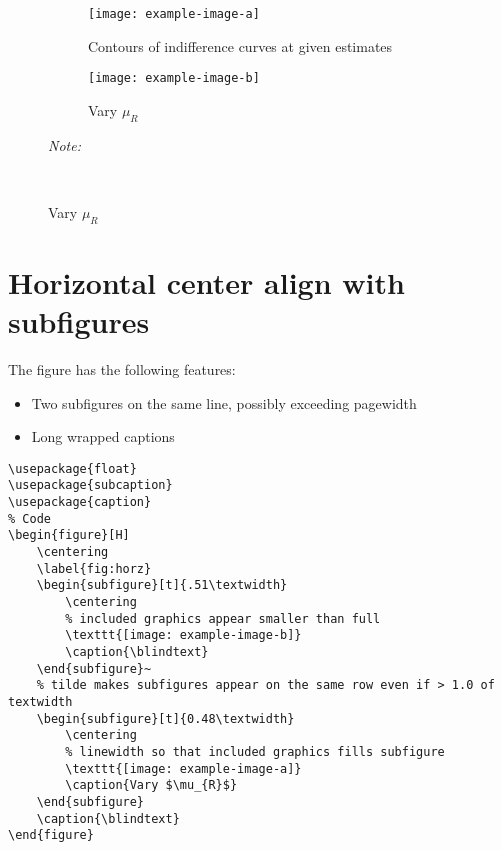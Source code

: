 \documentclass[12pt,english]{article}
\begin{document}
\par\medskip
\begin{figure}[H]
    \centering
    \captionsetup{width=.85\textwidth}
	\caption{\blindtext}
	\label{fig:vert}
	\begin{subfigure}[t]{0.45\textwidth}
        \centering
    		\caption{Contours of indifference curves at given estimates}
    		\texttt{[image: example-image-a]}
	\end{subfigure}
	\par\bigskip %
	\begin{subfigure}[t]{0.35\textwidth}
	    \centering
    		\caption{Vary $\mu_{R}$}
    		\texttt{[image: example-image-b]}
	\end{subfigure}
	\par\bigskip
    \parbox[t]{0.90\textwidth}{\footnotesize \emph{Note:} \blindtext}\\
\end{figure}
\pagebreak

\section{Horizontal center align with subfigures}

The figure has the following features:
\begin{itemize}
    \item Two subfigures on the same line, possibly exceeding pagewidth
    \item Long wrapped captions
\end{itemize}

\begin{lstlisting}[frame=single]
% Included Package
\usepackage{float}
\usepackage{subcaption}
\usepackage{caption}
% Code
\begin{figure}[H]
    \centering
	\label{fig:horz}
    \begin{subfigure}[t]{.51\textwidth}
        \centering
        % included graphics appear smaller than full
        \texttt{[image: example-image-b]}
        \caption{\blindtext}
    \end{subfigure}~
    % tilde makes subfigures appear on the same row even if > 1.0 of textwidth
	\begin{subfigure}[t]{0.48\textwidth}
	    \centering
	    % linewidth so that included graphics fills subfigure
    	\texttt{[image: example-image-a]}
    	\caption{Vary $\mu_{R}$}
	\end{subfigure}
	\caption{\blindtext}
\end{figure}
\end{lstlisting}
\end{document}
